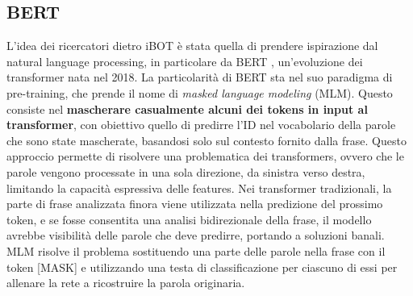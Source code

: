 \subsection{BERT}
L'idea dei ricercatori dietro iBOT è stata quella di prendere ispirazione dal natural language processing, in particolare da BERT \cite{bert}, un'evoluzione dei transformer nata nel 2018. La particolarità di BERT sta nel suo paradigma di pre-training, che prende il nome di \textit{masked language modeling} (MLM). Questo consiste nel \textbf{mascherare casualmente alcuni dei tokens in input al transformer}, con obiettivo quello di predirre l'ID nel vocabolario della parole che sono state mascherate, basandosi solo sul contesto fornito dalla frase. Questo approccio permette di risolvere una problematica dei transformers, ovvero che le parole vengono processate in una sola direzione, da sinistra verso destra, limitando la capacità espressiva delle features. Nei transformer tradizionali, la parte di frase analizzata finora viene utilizzata nella predizione del prossimo token, e se fosse consentita una analisi bidirezionale della frase, il modello avrebbe visibilità delle parole che deve predirre, portando a soluzioni banali. MLM risolve il problema sostituendo una parte delle parole nella frase con il token [MASK] e utilizzando una testa di classificazione per ciascuno di essi per allenare la rete a ricostruire la parola originaria.

